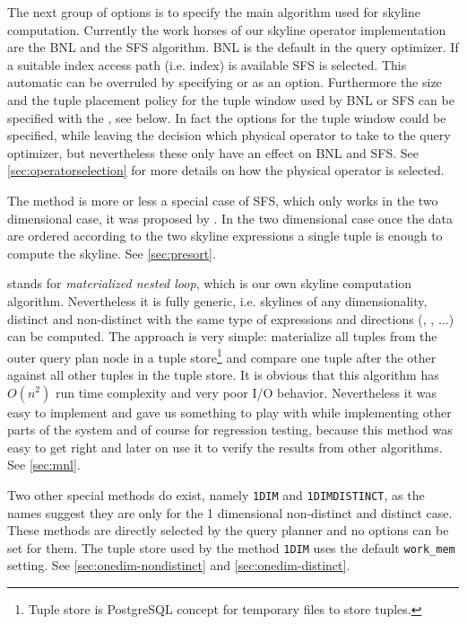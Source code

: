 The next group of options is to specify the main algorithm used for
skyline computation.
%
Currently the work horses of our skyline operator implementation
are the BNL and the SFS algorithm. 
BNL is the default in the query optimizer.
If a suitable index access path (i.e. index) is available SFS is
selected.
This automatic can be overruled by
specifying  or  as an option. Furthermore
the size and the tuple placement policy for the tuple window used by
BNL or SFS can be specified with the , see below.
In fact the options for the tuple window could be specified, while
leaving the decision which physical operator to take to the query
optimizer, but nevertheless these  only have an
effect on BNL and SFS. See \autoref{sec:operatorselection} for
more details on how the physical operator is selected.


The  method is more or less a special case of SFS,
which only works in the two dimensional case, it was proposed by 
\citet{Borzsonyi2001}. In the two dimensional case once the data
are ordered according to the two skyline expressions a single tuple is
enough to compute the skyline. See \autoref{sec:presort}.

 stands for \emph{materialized nested loop}, which
is our own \naive skyline computation algorithm.
Nevertheless it is fully generic, i.e. skylines of any dimensionality,
distinct and non-distinct with the same type of expressions and
directions (, , $\ldots$) can be
computed. The approach is very simple: materialize all tuples from the
outer query plan node in a tuple store\footnote{Tuple store is PostgreSQL concept for temporary files
to store tuples.} and compare one tuple after the other against all
other tuples in the tuple store. It is obvious that this algorithm has
$O(n^2)$ run time complexity and very poor I/O behavior. Nevertheless
it was easy to implement and gave us something to play with while
implementing other parts of the system and of course for regression
testing, because this method was easy to get right and later on
use it to verify the results from other algorithms. See
\autoref{sec:mnl}.

Two other special methods do exist, namely \texttt{1DIM} and
\texttt{1DIMDISTINCT}, as the names suggest they are only for the 1
dimensional non-distinct and distinct case.  These methods are
directly selected by the query planner and no options can be set for
them.  The tuple store used by the method \texttt{1DIM} uses the
default \texttt{work\_mem} setting. See
\autoref{sec:onedim-nondistinct} and
\autoref{sec:onedim-distinct}.

